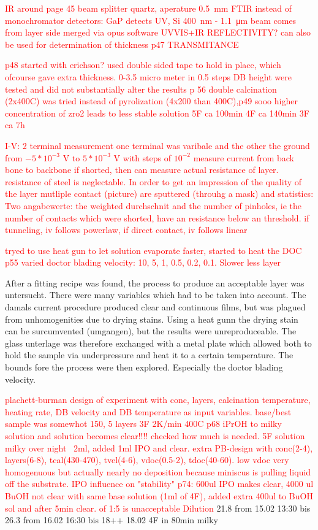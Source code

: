 \documentclass[a4paper]{article}
\newcommand{\td}[1]{\textcolor{red}{#1}}
\begin{document}
\td{IR around page 45
beam splitter quartz, aperature \SI{0.5}{\milli\meter} FTIR instead of monochromator
detectors: GaP detects UV, Si \SI{400}{\nano\meter} - \SI{1.1}{\micro\meter}
beam comes from layer side 
merged via opus software UVVIS+IR
REFLECTIVITY? can also be used for determination of thickness p47
TRANSMITANCE 
}

\td{p48 started with erichson? 
used double sided tape to hold in place, which ofcourse gave extra thickness.
0-3.5 micro meter in 0.5 steps DB height were tested and did not substantially 
alter the results p 56
double calcination (2x400C) was tried instead of pyrolization (4x200 than 400C),p49
sooo higher concentration of zro2 leads to less stable solution
5F ca 100min
4F ca 140min
3F ca 7h 
}

\td{I-V: 2 terminal measurement 
one terminal was varibale and the other the ground 
from $-5*10^{-3}$ V to $5*10^{-3}$ V with steps of $10^{-2}$
measure current from back bone to backbone 
if shorted, then can measure actual resistance of layer. resistance of steel 
is neglectable. In order to get an impression of the quality of the layer 
mutliple contact (picture) are sputtered (throuhg a mask) and statistics: 
Two angabewerte: the weighted durchschnit and the number of pinholes, ie the number of contacts which were shorted, have an resistance below an threshold.
if tunneling, iv follows powerlaw, if direct contact, iv follows linear
}

\td{tryed to use heat gun to let solution evaporate faster, started to heat the DOC p55}
\td{varied doctor blading velocity: 10, 5, 1, 0.5, 0.2, 0.1. Slower less layer}

After a fitting recipe was found, the process to produce an acceptable layer was untersucht. 
There were many variables which had to be taken into account. 
The damals current procedure produced clear and continuous films, but was plagued from 
unhomogenities due to drying stains. 
Using a heat gunn the drying stain can be surcumvented (umgangen), but the results were unreproduceable. 
The glass unterlage was therefore exchanged with a metal plate which allowed both to hold the sample via underpressure and heat it to a certain temperature.
The bounds fore the process were then explored. 
Especially the doctor blading velocity.

\td{plachett-burman design of experiment with conc, layers, calcination temperature, 
heating rate, DB velocity and DB temperature as input variables.}
\td{base/best sample was somewhot 150, 5 layers 3F 2K/min 400C}
\td{p68 iPrOH to milky solution and solution becomes clear!!!! checked how much 
is needed. 5F solution milky over night ~2ml, added 1ml IPO and clear.}
\td{extra PB-design with conc(2-4), layers(6-8), tcal(430-470), tvel(4-6),
vdoc(0.5-2), tdoc(40-60). low vdoc very homogenuous but actually nearly no 
deposition because miniscus is pulling liquid off the substrate.}
\td{IPO influence on "stability" p74: 600ul IPO makes clear, 4000 ul BuOH not clear with 
same base solution (1ml of 4F), added extra 400ul to BuOH sol and after 5min clear. 
of 1:5 is unacceptable Dilution }
21.8 from 15.02 13:30 bis 
26.3 from 16.02 16:30 bis 18++
18.02 4F in 80min milky
\end{document}
